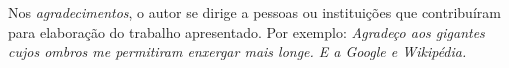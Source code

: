 Nos \emph{agradecimentos}, o autor se dirige a pessoas ou instituições que
contribuíram para elaboração do trabalho apresentado. Por exemplo: \emph{Agradeço aos gigantes cujos
ombros me permitiram enxergar mais longe. E a Google e Wikipédia.}